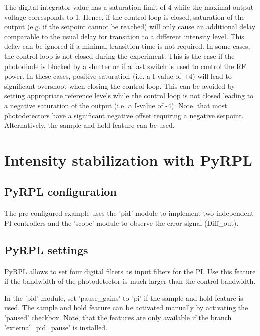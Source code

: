 \documentclass[twoside,a4paper]{refart}
\begin{document}
The digital integrator value has a saturation limit of 4 while the maximal output voltage corresponds to 1. Hence, if the control loop is closed, saturation of the output (e.g. if the setpoint cannot be reached) will only cause an additional delay comparable to the usual delay for transition to a different intensity level. This delay can be ignored if a minimal transition time is not required. In some cases, the control loop is not closed during the experiment. This is the case if the photodiode is blocked by a shutter or if a fast switch is used to control the RF power. In these cases, positive saturation (i.e. a I-value of +4) will lead to significant overshoot when closing the control loop. This can be avoided by setting appropriate reference levels while the control loop is not closed leading to a negative saturation of the output (i.e. a I-value of -4). Note, that most photodetectors have a significant negative offset requiring a negative setpoint. Alternatively, the sample and hold feature can be used.
 

\section{Intensity stabilization with PyRPL}

\subsection{PyRPL configuration}
The pre configured example uses the 'pid' module to implement two independent PI controllers and the 'scope' module to observe the error signal (Diff\_out).




\subsection{PyRPL settings}

PyRPL allows to set four digital filters as input filters for the PI. Use this feature if the bandwidth of the photodetector is much larger than the control bandwidth.

In the 'pid' module, set 'pause\_gains' to 'pi' if the sample and hold feature is used. The sample and hold feature can be activated manually by activating the 'paused' checkbox. Note, that the features are only available if the branch 'external\_pid\_pause' is installed.
\end{document}
